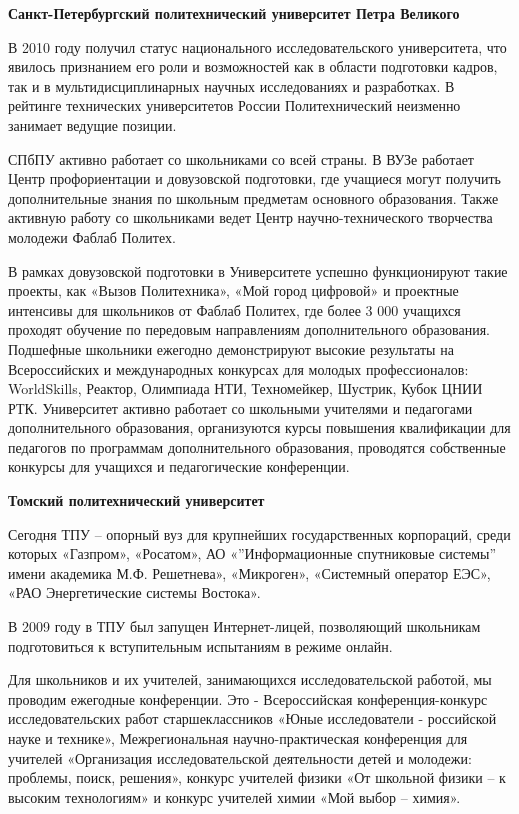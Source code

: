 \textbf{Санкт-Петербургский политехнический университет Петра Великого}

В 2010 году получил статус национального исследовательского университета, что явилось признанием его роли и возможностей как в области подготовки кадров, так и в мультидисциплинарных научных исследованиях и разработках. В рейтинге технических университетов России Политехнический неизменно занимает ведущие позиции.

СПбПУ активно работает со школьниками со всей страны. В ВУЗе работает Центр профориентации и довузовской подготовки, где учащиеся могут получить дополнительные знания по школьным предметам основного образования. Также активную работу со школьниками ведет Центр научно-технического творчества молодежи Фаблаб Политех.

В рамках довузовской подготовки в Университете успешно функционируют такие проекты, как «Вызов Политехника», «Мой город цифровой» и проектные интенсивы для школьников от Фаблаб Политех, где более 3 000 учащихся проходят обучение по передовым направлениям дополнительного образования. Подшефные школьники ежегодно демонстрируют высокие результаты на Всероссийских и международных конкурсах для молодых профессионалов: WorldSkills, Реактор, Олимпиада НТИ, Техномейкер, Шустрик, Кубок ЦНИИ РТК. Университет активно работает со школьными учителями и педагогами дополнительного образования, организуются курсы повышения квалификации для педагогов по программам дополнительного образования, проводятся собственные конкурсы для учащихся и педагогические конференции.

\textbf{Томский политехнический университет}

Сегодня ТПУ – опорный вуз для крупнейших государственных корпораций, среди которых «Газпром», «Росатом», АО «”Информационные спутниковые системы” имени академика М.Ф. Решетнева», «Микроген», «Системный оператор ЕЭС», «РАО Энергетические системы Востока».

В 2009 году в ТПУ был запущен Интернет-лицей, позволяющий школьникам подготовиться к вступительным испытаниям в режиме онлайн.

Для школьников и их учителей, занимающихся исследовательской работой, мы проводим ежегодные конференции. Это - Всероссийская конференция-конкурс исследовательских работ старшеклассников «Юные исследователи - российской науке и технике», Межрегиональная научно-практическая конференция для учителей «Организация исследовательской деятельности детей и молодежи: проблемы, поиск, решения»,  конкурс учителей физики «От школьной физики – к высоким технологиям» и конкурс учителей химии «Мой выбор – химия».

